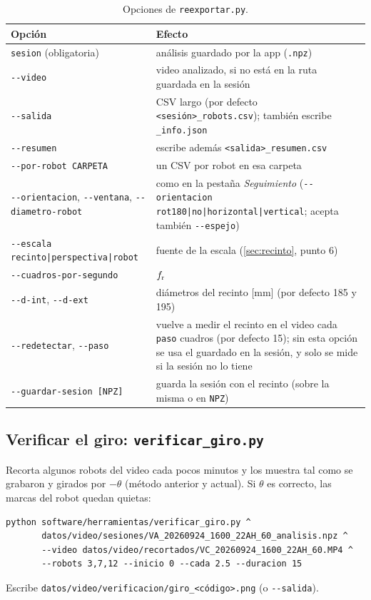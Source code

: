 \begin{table}[H]
  \centering
  \caption{Opciones de \texttt{reexportar.py}.}
  \small
  \begin{tabular}{@{}p{4.4cm}p{10.2cm}@{}}
    \toprule
    Opción & Efecto \\
    \midrule
    \texttt{sesion} (obligatoria) & análisis guardado por la app (\texttt{.npz}) \\
    \texttt{-{}-video} & video analizado, si no está en la ruta guardada en la sesión \\
    \texttt{-{}-salida} & CSV largo (por defecto \texttt{<sesión>\_robots.csv}); también escribe \texttt{\_info.json} \\
    \texttt{-{}-resumen} & escribe además \texttt{<salida>\_resumen.csv} \\
    \texttt{-{}-por-robot CARPETA} & un CSV por robot en esa carpeta \\
    \texttt{-{}-orientacion}, \texttt{-{}-ventana}, \texttt{-{}-diametro-robot} & como en la pestaña \emph{Seguimiento} (\texttt{-{}-orientacion rot180|no|horizontal|vertical}; acepta también \texttt{-{}-espejo}) \\
    \texttt{-{}-escala recinto|perspectiva|robot} & fuente de la escala (\cref{sec:recinto}, punto 6) \\
    \texttt{-{}-cuadros-por-segundo} & $f_{\mathrm{r}}$ \\
    \texttt{-{}-d-int}, \texttt{-{}-d-ext} & diámetros del recinto [\si{\milli\metre}] (por defecto 185 y 195) \\
    \texttt{-{}-redetectar}, \texttt{-{}-paso} & vuelve a medir el recinto en el video cada \texttt{paso} cuadros (por defecto 15); sin esta opción se usa el guardado en la sesión, y solo se mide si la sesión no lo tiene \\
    \texttt{-{}-guardar-sesion [NPZ]} & guarda la sesión con el recinto (sobre la misma o en \texttt{NPZ}) \\
    \bottomrule
  \end{tabular}
\end{table}

\subsection{Verificar el giro: \texttt{verificar\_giro.py}}

Recorta algunos robots del video cada pocos minutos y los muestra tal como se grabaron y girados por
$-\theta$ (método anterior y actual). Si $\theta$ es correcto, las marcas del robot quedan quietas:
\begin{verbatim}
python software/herramientas/verificar_giro.py ^
       datos/video/sesiones/VA_20260924_1600_22AH_60_analisis.npz ^
       --video datos/video/recortados/VC_20260924_1600_22AH_60.MP4 ^
       --robots 3,7,12 --inicio 0 --cada 2.5 --duracion 15
\end{verbatim}
Escribe \nolinkurl{datos/video/verificacion/giro_<código>.png} (o \texttt{-{}-salida}).

